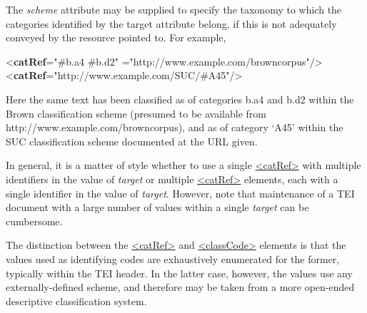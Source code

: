 The {\itshape scheme} attribute may be supplied to specify the taxonomy to which the categories identified by the target attribute belong, if this is not adequately conveyed by the resource pointed to. For example, \par\bgroup{}\exampleFont \begin{shaded}\noindent\mbox{}{<\textbf{catRef}\hspace*{1em}{target}="{\#b.a4 \#b.d2}"\mbox{}\newline 
\hspace*{1em}{scheme}="{http://www.example.com/browncorpus}"/>}\mbox{}\newline 
{<\textbf{catRef}\hspace*{1em}{target}="{http://www.example.com/SUC/\#A45}"/>}\end{shaded}\egroup\par \noindent  Here the same text has been classified as of categories b.a4 and b.d2 within the Brown classification scheme (presumed to be available from \textsf{http://www.example.com/browncorpus}), and as of category ‘A45’ within the SUC classification scheme documented at the URL given.\par
In general, it is a matter of style whether to use a single \hyperref[TEI.catRef]{<catRef>} with multiple identifiers in the value of {\itshape target} or multiple \hyperref[TEI.catRef]{<catRef>} elements, each with a single identifier in the value of {\itshape target}. However, note that maintenance of a TEI document with a large number of values within a single {\itshape target} can be cumbersome.\par
The distinction between the \hyperref[TEI.catRef]{<catRef>} and \hyperref[TEI.classCode]{<classCode>} elements is that the values used as identifying codes are exhaustively enumerated for the former, typically within the TEI header. In the latter case, however, the values use any externally-defined scheme, and therefore may be taken from a more open-ended descriptive classification system.
